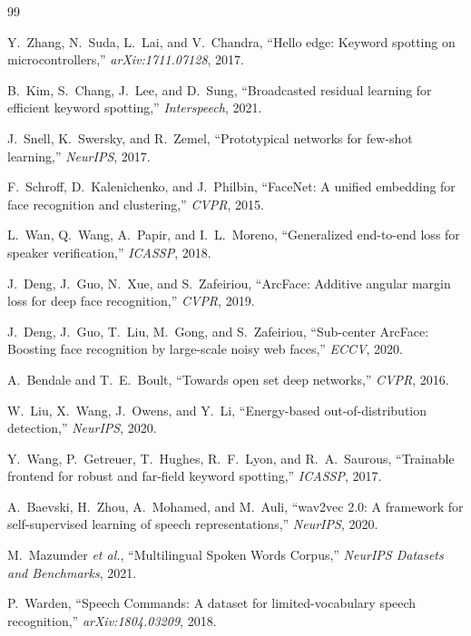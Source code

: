 \documentclass[10pt,twocolumn]{article}
\begin{document}
\begin{thebibliography}{99}
\footnotesize

Y.~Zhang, N.~Suda, L.~Lai, and V.~Chandra,
``Hello edge: Keyword spotting on microcontrollers,''
\emph{arXiv:1711.07128}, 2017.

B.~Kim, S.~Chang, J.~Lee, and D.~Sung,
``Broadcasted residual learning for efficient keyword spotting,''
\emph{Interspeech}, 2021.

J.~Snell, K.~Swersky, and R.~Zemel,
``Prototypical networks for few-shot learning,''
\emph{NeurIPS}, 2017.

F.~Schroff, D.~Kalenichenko, and J.~Philbin,
``FaceNet: A unified embedding for face recognition and clustering,''
\emph{CVPR}, 2015.

L.~Wan, Q.~Wang, A.~Papir, and I.~L.~Moreno,
``Generalized end-to-end loss for speaker verification,''
\emph{ICASSP}, 2018.

J.~Deng, J.~Guo, N.~Xue, and S.~Zafeiriou,
``ArcFace: Additive angular margin loss for deep face recognition,''
\emph{CVPR}, 2019.

J.~Deng, J.~Guo, T.~Liu, M.~Gong, and S.~Zafeiriou,
``Sub-center ArcFace: Boosting face recognition by large-scale noisy web faces,''
\emph{ECCV}, 2020.

A.~Bendale and T.~E.~Boult,
``Towards open set deep networks,''
\emph{CVPR}, 2016.

W.~Liu, X.~Wang, J.~Owens, and Y.~Li,
``Energy-based out-of-distribution detection,''
\emph{NeurIPS}, 2020.

Y.~Wang, P.~Getreuer, T.~Hughes, R.~F.~Lyon, and R.~A.~Saurous,
``Trainable frontend for robust and far-field keyword spotting,''
\emph{ICASSP}, 2017.

A.~Baevski, H.~Zhou, A.~Mohamed, and M.~Auli,
``wav2vec 2.0: A framework for self-supervised learning of speech
representations,'' \emph{NeurIPS}, 2020.

M.~Mazumder \emph{et al.},
``Multilingual Spoken Words Corpus,''
\emph{NeurIPS Datasets and Benchmarks}, 2021.

P.~Warden,
``Speech Commands: A dataset for limited-vocabulary speech recognition,''
\emph{arXiv:1804.03209}, 2018.

\end{thebibliography}
\end{document}
